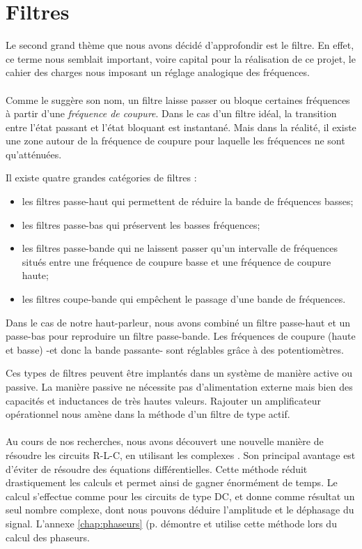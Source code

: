 \section{Filtres}
Le second grand thème que nous avons décidé d'approfondir est le filtre. En effet, ce terme nous semblait 
important, voire capital pour la réalisation de ce projet, le cahier des charges nous imposant un réglage 
analogique des fréquences.

\paragraph{}
Comme le suggère son nom, un filtre laisse passer ou bloque certaines fréquences à partir d'une \emph{fréquence de coupure}. Dans le cas d'un filtre idéal, la transition entre l'état passant et l'état bloquant est instantané. Mais dans la réalité, il existe une zone autour de la fréquence de coupure pour laquelle les fréquences ne sont qu'atténuées. 

Il existe quatre grandes catégories de filtres \cite{Kularatna} : 
\begin{itemize}
\item les filtres passe-haut qui permettent de réduire la bande de fréquences basses;
\item les filtres passe-bas qui préservent les basses fréquences;
\item les filtres passe-bande qui ne laissent passer qu'un intervalle de fréquences situés entre une fréquence de coupure basse et une fréquence de coupure haute;
\item les filtres coupe-bande qui empêchent le passage d'une bande de fréquences.
\end{itemize}
Dans le cas de notre haut-parleur, nous avons combiné un filtre passe-haut et un passe-bas pour reproduire un filtre passe-bande. Les fréquences de coupure (haute et basse) -et donc la bande passante- sont réglables grâce à des potentiomètres.

Ces types de filtres peuvent être implantés dans un système de manière active ou passive. La manière passive ne nécessite pas d'alimentation externe mais bien des 
capacités et inductances de très hautes valeurs. Rajouter un amplificateur opérationnel nous amène dans la méthode d'un filtre de type actif. \cite{Kularatna}

\paragraph{}
Au cours de nos recherches, nous avons découvert une nouvelle manière de résoudre les circuits R-L-C, en utilisant les 
complexes \cite{Irwin}. Son principal avantage est d'éviter de résoudre des équations différentielles. Cette méthode réduit drastiquement les calculs et permet ainsi de gagner énormément de temps. Le calcul s'effectue comme pour les circuits de type DC, et donne comme résultat un seul nombre complexe, dont nous pouvons déduire l'amplitude et le déphasage du signal.
L'annexe \ref{chap:phaseurs} (p. \pageref{chap:phaseurs} démontre et utilise cette méthode lors du calcul des phaseurs.  

